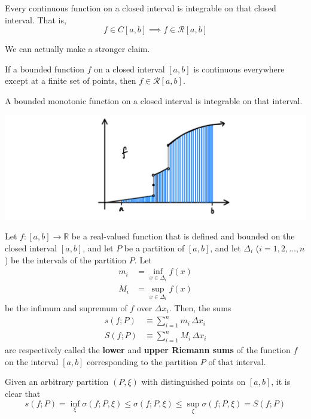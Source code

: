 \documentclass{article}
\begin{document}
      \begin{corollary}
      Every continuous function on a closed interval is integrable on that closed interval. That is, 
      \[f \in C[a, b] \implies f \in \mathcal{R}[a, b]\]
      \end{corollary}

      We can actually make a stronger claim. 

      \begin{corollary}
      If a bounded function $f$ on a closed interval $[a, b]$ is continuous everywhere except at a finite set of points, then $f \in \mathcal{R}[a, b]$. 
      \end{corollary}

      \begin{corollary}
      A bounded monotonic function on a closed interval is integrable on that interval. 
      \begin{center}
          \includegraphics[scale=0.25]{img/Integrability_of_Monotonic_Function.PNG}
      \end{center}
      \end{corollary}

      \begin{definition}
        Let $f: [a, b] \longrightarrow \mathbb{R}$ be a real-valued function that is defined and bounded on the closed interval $[a, b]$, and let $P$ be a partition of $[a, b]$, and let $\Delta_i$ ($i = 1, 2, \ldots, n$) be the intervals of the partition $P$. Let 
        \begin{align*}
            m_i &= \inf_{x \in \Delta_i} f(x) \\
            M_i &= \sup_{x \in \Delta_i} f(x)
        \end{align*}
        be the infimum and supremum of $f$ over $\Delta x_i$. Then, the sums
        \begin{align*}
            s(f; P) & \equiv \sum_{i = 1}^n m_i \, \Delta x_i \\
            S(f; P) & \equiv \sum_{i=1}^n M_i \, \Delta x_i
        \end{align*}
        are respectively called the \textbf{lower} and \textbf{upper Riemann sums} of the function $f$ on the interval $[a, b]$ corresponding to the partition $P$ of that interval. 

        Given an arbitrary partition $(P, \xi)$ with distinguished points on $[a, b]$, it is clear that
        \[s(f; P) = \inf_{\xi} \sigma(f; P, \xi) \leq \sigma(f; P, \xi) \leq \sup_{\xi} \sigma(f; P, \xi) = S(f; P)\]
      \end{definition}
\end{document}
